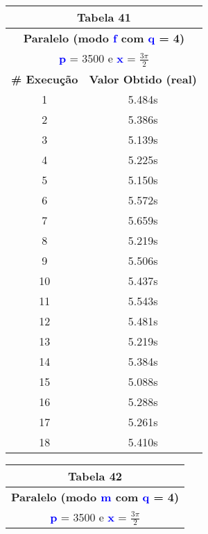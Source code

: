 \documentclass[11pt]{article}
\begin{document}
\begin{table}[!h]
	\begin{center}
		\begin{minipage}{0.48\textwidth}
			\begin{tabular}{| c | c |}
			\hline
			\multicolumn{2}{|c|}{\textbf{Tabela 41}} \\ \hline
			\multicolumn{2}{|c|}{\textbf{Paralelo (modo \textbf{\textcolor{blue}{f}} com \textbf{\textcolor{blue}{q}} = 4)}} \\
			\multicolumn{2}{|c|}{\textbf{\textcolor{blue}{p}} = 3500 e \textbf{\textcolor{blue}{x}} = $\frac{3\pi}{2}$} \\ [0.2ex]
			\hline
				\textbf{\# Execução} &  \textbf{Valor Obtido (real)} \\ \hline
				1 & 5.484s \\ \hline
				2 & 5.386s \\ \hline
				3 & 5.139s \\ \hline
				4 & 5.225s \\ \hline
				5 & 5.150s \\ \hline
				6 & 5.572s \\ \hline
				7 & 5.659s \\ \hline
				8 & 5.219s \\ \hline
				9 & 5.506s \\ \hline
				10 & 5.437s \\ \hline
				11 & 5.543s \\ \hline
				12 & 5.481s \\ \hline
				13 & 5.219s \\ \hline
				14 & 5.384s \\ \hline
				15 & 5.088s \\ \hline
				16 & 5.288s \\ \hline
				17 & 5.261s \\ \hline
				18 & 5.410s \\ \hline
			\end{tabular}
		\end{minipage}
		\begin{minipage}{0.48\textwidth}
			\begin{tabular}{| c | c |}
			\hline
			\multicolumn{2}{|c|}{\textbf{Tabela 42}} \\ \hline
			\multicolumn{2}{|c|}{\textbf{Paralelo (modo \textbf{\textcolor{blue}{m}} com \textbf{\textcolor{blue}{q}} = 4)}} \\
			\multicolumn{2}{|c|}{\textbf{\textcolor{blue}{p}} = 3500 e \textbf{\textcolor{blue}{x}} = $\frac{3\pi}{2}$} \\ [0.2ex]

\end{tabular}
\end{minipage}
\end{center}
\end{table}
\end{document}
